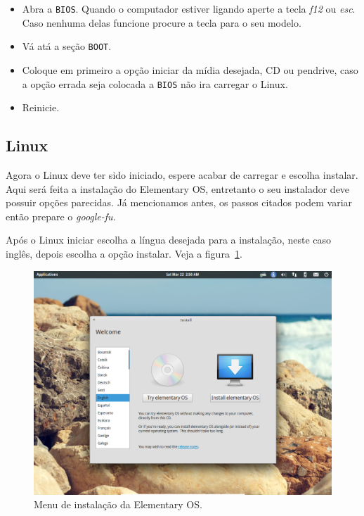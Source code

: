\documentclass{handout_utfpr}
\begin{document}
\begin{itemize}\label{itm:boot-order}
    \item Abra a \texttt{BIOS}\@. Quando o computador estiver ligando aperte a tecla \emph{f12} ou \emph{esc}. Caso nenhuma delas funcione procure a tecla para o seu modelo.
    \item Vá atá a seção \texttt{BOOT}.
    \item Coloque em primeiro a opção iniciar da mídia desejada, CD ou pendrive, caso a opção errada seja colocada a \texttt{BIOS} não ira carregar o Linux.
    \item Reinicie.
\end{itemize}

\subsection{Linux}

Agora o Linux deve ter sido iniciado, espere acabar de carregar e escolha instalar. Aqui será feita a instalação do Elementary OS, entretanto o seu instalador deve possuir opções parecidas. Já mencionamos antes, os passos citados podem variar então prepare o \emph{google-fu}.

Após o Linux iniciar escolha a língua desejada para a instalação, neste caso inglês, depois escolha a opção instalar. Veja a figura~\ref{fig:elementary-menu}.

\begin{figure}[H]
  \centering
  \includegraphics[scale=.3]{imagens/elementary-install-01.png}
  \caption{Menu de instalação da Elementary OS\@.}
  \label{fig:elementary-menu}
\end{figure}
\end{document}
